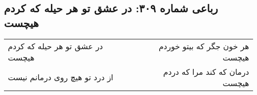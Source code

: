 \begin{center}
\section*{رباعی شماره ۳۰۹: در عشق تو هر حیله که کردم هیچست}
\label{sec:0309}
\begin{longtable}{l p{0.5cm} r}
در عشق تو هر حیله که کردم هیچست
&&
هر خون جگر که بیتو خوردم هیچست
\\
از درد تو هیچ روی درمانم نیست
&&
درمان که کند مرا که دردم هیچست
\\
\end{longtable}
\end{center}
